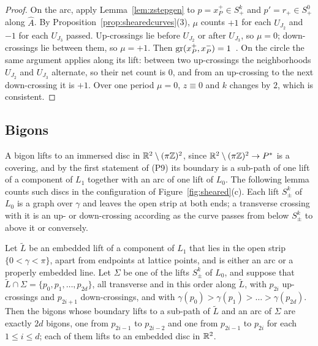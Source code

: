 \begin{proof}
On the arc, apply Lemma~\ref{lem:zstepgen} to $p=x_P^+\in S^k_+$ and $p'=r_+\in S^0_+$ along $\hat A$. By
Proposition~\ref{prop:shearedcurves}(3), $\mu$ counts $+1$ for each $U_{J_2}$ and $-1$ for each $U_{J_3}$ passed. Up-crossings lie
before $U_{J_2}$ or after $U_{J_3}$, so $\mu=0$; down-crossings lie between them, so $\mu=+1$. Then
$\operatorname{gr}(x_P^+,x_P^-)=1$~\cite[\S5.1]{HHK2}. On the circle the same argument applies along its lift: between two up-crossings the
neighborhoods $U_{J_2}$ and $U_{J_3}$ alternate, so their net count is $0$, and from an up-crossing to the next down-crossing
it is $+1$. Over one period $\mu=0$, $z\equiv0$ and $k$ changes by $2$, which is consistent.
\end{proof}

\subsection{Bigons}\label{ss:bigons-P}

A bigon lifts to an immersed disc in $\mathbb{R}^2\setminus(\pi\mathbb{Z})^2$, since $\mathbb{R}^2\setminus(\pi\mathbb{Z})^2\to P^{*}$ is a covering, and by the first
statement of (P9) its boundary is a sub-path of one lift of a component of $L_1$ together with an arc of one lift of $L_0$.
The following lemma counts such discs in the configuration of Figure~\ref{fig:sheared}(c). Each lift $S^k_\pm$ of $L_0$ is a
graph over $\gamma$ and leaves the open strip at both ends; a transverse crossing with it is an up- or down-crossing
according as the curve passes from below $S^k_\pm$ to above it or conversely.

\begin{lemma}\label{lem:zigzag}
Let $\tilde L$ be an embedded lift of a component of $L_1$ that lies in the open strip $\{0<\gamma<\pi\}$, apart from endpoints at
lattice points, and is either an arc or a properly embedded line. Let $\Sigma$ be one of the lifts $S^k_\pm$ of $L_0$, and suppose that
$\tilde L\cap\Sigma=\{p_0,p_1,\dots,p_{2d}\}$, all transverse and in this order along $\tilde L$, with $p_{2i}$ up-crossings and $p_{2i+1}$
down-crossings, and with $\gamma(p_0)>\gamma(p_1)>\dots>\gamma(p_{2d})$. Then the bigons whose boundary lifts to a sub-path of $\tilde L$
and an arc of $\Sigma$ are exactly $2d$ bigons, one from $p_{2i-1}$ to $p_{2i-2}$ and one from $p_{2i-1}$ to $p_{2i}$ for each
$1\le i\le d$; each of them lifts to an embedded disc in $\mathbb{R}^2$.
\end{lemma}

